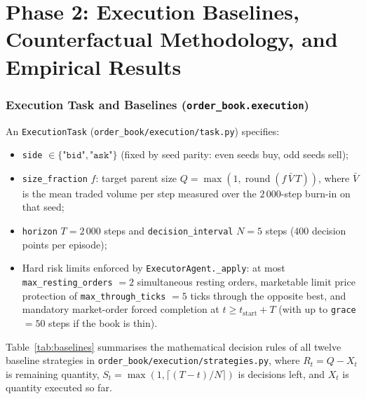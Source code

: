 \documentclass[11pt,a4paper]{article}
\newcommand{\code}[1]{\texttt{#1}}
\begin{document}
\part{Phase 2: Execution Baselines, Counterfactual Methodology, and Empirical Results}
\label{part:two}

\section[Execution Task and Baseline Strategies]{Execution Task and Baselines (\code{order\_book.execution})}
\label{sec:task_baselines}

An \code{ExecutionTask} (\code{order\_book/execution/task.py}) specifies:
\begin{itemize}[nosep]
\item \code{side} $\in \{\code{"bid"}, \code{"ask"}\}$ (fixed by seed parity: even seeds buy, odd seeds sell);
\item \code{size\_fraction} $f$: target parent size $Q = \max(1, \operatorname{round}(f\,\bar V\,T))$,
  where $\bar V$ is the mean traded volume per step measured over the $2\,000$-step burn-in on that seed;
\item \code{horizon} $T = 2\,000$ steps and \code{decision\_interval} $N = 5$ steps ($400$ decision points
  per episode);
\item Hard risk limits enforced by \code{ExecutorAgent.\_apply}: at most \code{max\_resting\_orders} $= 2$
  simultaneous resting orders, marketable limit price protection of \code{max\_through\_ticks} $= 5$ ticks
  through the opposite best, and mandatory market-order forced completion at $t \ge t_{\text{start}} + T$
  (with up to \code{grace} $= 50$ steps if the book is thin).
\end{itemize}

Table~\ref{tab:baselines} summarises the mathematical decision rules of all twelve baseline strategies in
\code{order\_book/execution/strategies.py}, where $R_t = Q - X_t$ is remaining quantity, $S_t =
\max(1, \lceil (T - t)/N \rceil)$ is decisions left, and $X_t$ is quantity executed so far.
\end{document}
